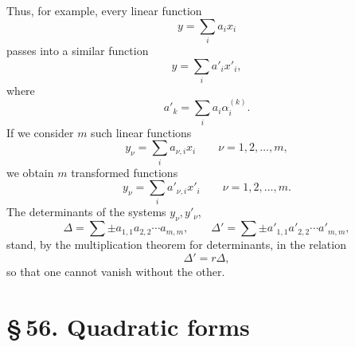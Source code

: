 \documentclass[11pt]{article}
\providecommand{\sect}[2]{\section*{\S\,#1. #2}}
\begin{document}
Thus, for example, every linear function
\[
 y=\sum_i a_i x_i
\]
passes into a similar function
\[
 y=\sum_i a'_i x'_i,
\]
where
\begin{equation}
 a'_k=\sum_i a_i\alpha_i^{(k)}.
\tag{3}
\end{equation}
If we consider $m$ such linear functions
\[
 y_\nu=\sum_i a_{\nu,i}x_i\qquad \nu=1,2,\ldots,m,
\]
we obtain $m$ transformed functions
\[
 y_\nu=\sum_i a'_{\nu,i}x'_i\qquad \nu=1,2,\ldots,m.
\]
The determinants of the systems $y_\nu,y'_\nu$,
\[
 \Delta=\sum \pm a_{1,1}a_{2,2}\cdots a_{m,m},
 \qquad
 \Delta'=\sum \pm a'_{1,1}a'_{2,2}\cdots a'_{m,m},
\]
stand, by the multiplication theorem for determinants, in the relation
\begin{equation}
 \Delta'=r\Delta,
\tag{4}
\end{equation}
so that one cannot vanish without the other.

\sect{56}{Quadratic forms}
\end{document}
